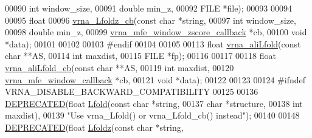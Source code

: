 \begin{DoxyCode}
00090             \textcolor{keywordtype}{int}         window\_size,
00091             \textcolor{keywordtype}{double}      min\_z,
00092             FILE        *file);
00093 
00094 
00095 \textcolor{keywordtype}{float}
00096 \mbox{\hyperlink{_lfold_8h_a41b18568b846f1db70cdf2fe83b0ed47}{vrna\_Lfoldz\_cb}}(\textcolor{keyword}{const} \textcolor{keywordtype}{char}                       *\textcolor{keywordtype}{string},
00097                \textcolor{keywordtype}{int}                              window\_size,
00098                \textcolor{keywordtype}{double}                           min\_z,
00099                \mbox{\hyperlink{mfe_8h_afeb8eb92805a0f0045dc20646ed0255b}{vrna\_mfe\_window\_zscore\_callback}}  *cb,
00100                \textcolor{keywordtype}{void}                             *data);
00101 
00102 
00103 \textcolor{preprocessor}{#endif}
00104 
00105 
00113 \textcolor{keywordtype}{float} \mbox{\hyperlink{_lfold_8h_a4ed226a726e2c85fbacf9705591becee}{vrna\_aliLfold}}(\textcolor{keyword}{const} \textcolor{keywordtype}{char}  **AS,
00114                     \textcolor{keywordtype}{int}         maxdist,
00115                     FILE        *fp);
00116 
00117 
00118 \textcolor{keywordtype}{float} \mbox{\hyperlink{_lfold_8h_a04c8e0d7d4a1c28378b5046e8f62d9e8}{vrna\_aliLfold\_cb}}(\textcolor{keyword}{const} \textcolor{keywordtype}{char}               **AS,
00119                        \textcolor{keywordtype}{int}                      maxdist,
00120                        \mbox{\hyperlink{group__mfe__fold_ga4f3e5bc214ef803074ace313cb9571b4}{vrna\_mfe\_window\_callback}} *cb,
00121                        \textcolor{keywordtype}{void}                     *data);
00122 
00123 
00124 \textcolor{preprocessor}{#ifndef VRNA\_DISABLE\_BACKWARD\_COMPATIBILITY}
00125 
00136 \mbox{\hyperlink{_lfold_8h_aab347a3c03fbe8e7319551b9fa0cce4a}{DEPRECATED}}(\textcolor{keywordtype}{float} \mbox{\hyperlink{group__local__mfe__fold_ga16e5a70e60835bb969eaecbe6482f1be}{Lfold}}(\textcolor{keyword}{const} \textcolor{keywordtype}{char} *\textcolor{keywordtype}{string},
00137                        \textcolor{keywordtype}{char}       *structure,
00138                        \textcolor{keywordtype}{int}        maxdist),
00139 \textcolor{stringliteral}{"Use vrna\_Lfold() or vrna\_Lfold\_cb() instead"});
00140 
00148 \mbox{\hyperlink{_lfold_8h_aab347a3c03fbe8e7319551b9fa0cce4a}{DEPRECATED}}(\textcolor{keywordtype}{float} \mbox{\hyperlink{group__local__mfe__fold_gab6d79eecc180f586679f7b85cce5cbe9}{Lfoldz}}(\textcolor{keyword}{const} \textcolor{keywordtype}{char}  *\textcolor{keywordtype}{string},

\end{DoxyCode}

